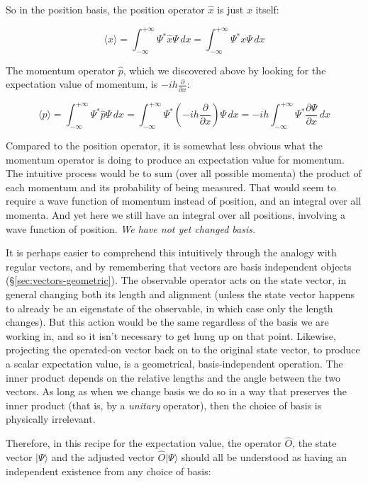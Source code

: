 So in the position basis, the position operator $\hat{x}$ is just $x$ itself:

$$
\langle x \rangle =
\int_{-\infty}^{+\infty}
\Psi^*
\hat{x}
\Psi
\,dx
=
\int_{-\infty}^{+\infty}
\Psi^*
x
\Psi
\,dx
$$

The momentum operator $\hat{p}$, which we discovered above by looking for the expectation value of momentum, is $-ih\frac{\partial}{\partial x}$:

$$
\langle p \rangle =
\int_{-\infty}^{+\infty}
\Psi^*
\hat{p}
\Psi
\,dx
=
\int_{-\infty}^{+\infty}
\Psi^*
(-ih\frac{\partial}{\partial x})
\Psi
\,dx
= -ih
\int_{-\infty}^{+\infty}
\Psi^*
\frac{\partial \Psi}{\partial x}
\,dx
$$

Compared to the position operator, it is somewhat less obvious what the momentum operator is doing to produce an expectation value for momentum. The intuitive process would be to sum (over all possible momenta) the product of each momentum and its probability of being measured. That would seem to require a wave function of momentum instead of position, and an integral over all momenta. And yet here we still have an integral over all positions, involving a wave function of position. \textit{We have not yet changed basis.}

It is perhaps easier to comprehend this intuitively through the analogy with regular vectors, and by remembering that vectors are basis independent objects (§\ref{sec:vectors-geometric}). The observable operator acts on the state vector, in general changing both its length and alignment (unless the state vector happens to already be an eigenstate of the observable, in which case only the length changes). But this action would be the same regardless of the basis we are working in, and so it isn't necessary to get hung up on that point. Likewise, projecting the operated-on vector back on to the original state vector, to produce a scalar expectation value, is a geometrical, basis-independent operation. The inner product depends on the relative lengths and the angle between the two vectors. As long as when we change basis we do so in a way that preserves the inner product (that is, by a \textit{unitary} operator), then the choice of basis is physically irrelevant. 

Therefore, in this recipe for the expectation value, the operator $\hat{O}$, the state vector $| \Psi \rangle$ and the adjusted vector $\hat{O} | \Psi \rangle$ should all be understood as having an independent existence from any choice of basis:

